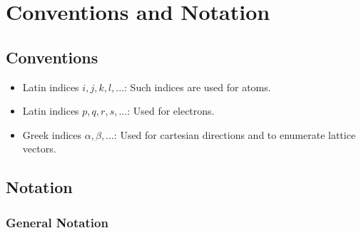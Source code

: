 
\chapter{Conventions and Notation}
\label{ch:si-nerd}

\section{Conventions}

\begin{itemize}
	\item Latin indices $i,j,k,l,...$: Such indices are used for atoms.
	\item Latin indices $p,q,r,s,...$: Used for electrons.
	\item Greek indices $\alpha, \beta, ...$: Used for cartesian directions and to enumerate lattice vectors.
\end{itemize}



\section{Notation}

\subsection{General Notation}

